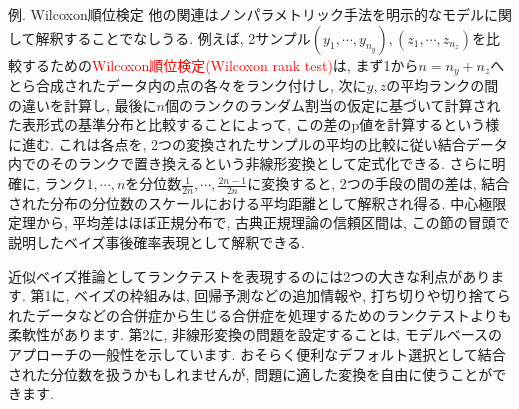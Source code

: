 \documentclass[10pt,dvipdfmx,a4]{beamer}
\newcommand{\tcr}[1]{\textcolor{red}{#1}}
\begin{document}

\begin{frame}{例. Wilcoxon順位検定}
他の関連はノンパラメトリック手法を明示的なモデルに関して解釈することでなしうる.
例えば, 2サンプル$(y_1,\cdots,y_{n_y}), (z_1,\cdots,z_{n_z})$を比較するための\tcr{Wilcoxon順位検定(Wilcoxon rank test)}は, まず1から$n=n_y+n_z$へとら合成されたデータ内の点の各々をランク付けし, 次に$y, z$の平均ランクの間の違いを計算し, 最後に$n$個のランクのランダム割当の仮定に基づいて計算された表形式の基準分布と比較することによって, この差のp値を計算するという様に進む.
これは各点を, 2つの変換されたサンプルの平均の比較に従い結合データ内でのそのランクで置き換えるという非線形変換として定式化できる.
さらに明確に, ランク$1, \cdots, n$を分位数$\tfrac{1}{2n},\cdots,\tfrac{2n-1}{2n}$に変換すると, 2つの手段の間の差は, 結合された分布の分位数のスケールにおける平均距離として解釈され得る.
中心極限定理から, 平均差はほぼ正規分布で, 古典正規理論の信頼区間は, この節の冒頭で説明したベイズ事後確率表現として解釈できる.
\end{frame}


\begin{frame}
近似ベイズ推論としてランクテストを表現するのには2つの大きな利点があります.
第1に, ベイズの枠組みは, 回帰予測などの追加情報や, 打ち切りや切り捨てられたデータなどの合併症から生じる合併症を処理するためのランクテストよりも柔軟性があります.
第2に, 非線形変換の問題を設定することは, モデルベースのアプローチの一般性を示しています.
おそらく便利なデフォルト選択として結合された分位数を扱うかもしれませんが, 問題に適した変換を自由に使うことができます.
\end{frame}

\end{document}
